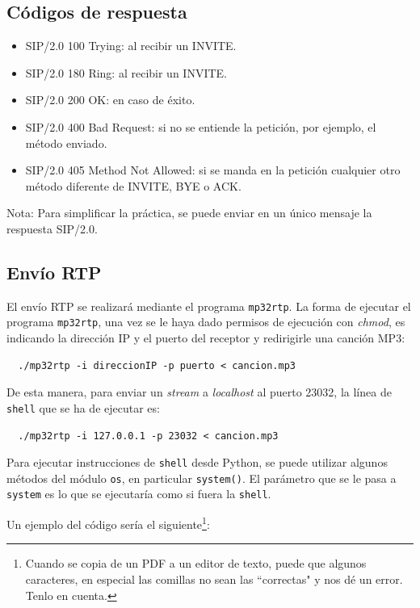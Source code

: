 \documentclass[a4paper,11pt]{article}
\begin{document}
\subsection*{Códigos de respuesta}

   \begin{itemize}
     \item SIP/2.0 100 Trying: al recibir un INVITE.
     \item SIP/2.0 180 Ring: al recibir un INVITE.
     \item SIP/2.0 200 OK: en caso de éxito.
     \item SIP/2.0 400 Bad Request: si no se entiende la petición, por ejemplo, el método enviado.
     \item SIP/2.0 405 Method Not Allowed: si se manda en la petición cualquier otro método diferente de INVITE, BYE o ACK.
   \end{itemize}

Nota: Para simplificar la práctica, se puede enviar en un único mensaje la respuesta SIP/2.0.

\subsection*{Envío RTP}

El envío RTP se realizará mediante el programa \texttt{mp32rtp}. La forma de ejecutar el programa \texttt{mp32rtp}, una vez se le haya dado permisos de ejecución con \emph{chmod}, es indicando la dirección IP y el puerto del receptor y redirigirle una canción MP3:

\begin{verbatim}
  ./mp32rtp -i direccionIP -p puerto < cancion.mp3
\end{verbatim}

De esta manera, para enviar un \emph{stream} a \emph{localhost} al puerto 23032, la línea de \texttt{shell} que se ha de ejecutar es:

\begin{verbatim}
  ./mp32rtp -i 127.0.0.1 -p 23032 < cancion.mp3
\end{verbatim}

Para ejecutar instrucciones de \texttt{shell} desde Python, se puede utilizar algunos métodos del módulo \texttt{os}, en particular \texttt{system()}. El parámetro que se le pasa a \texttt{system} 
es lo que se ejecutaría como si fuera la \texttt{shell}.

Un ejemplo del código sería el siguiente\footnote{Cuando se copia de un PDF
a un editor de texto, puede que algunos caracteres, en especial las comillas
no sean las ``correctas" y nos dé un error. Tenlo en cuenta.}:
\end{document}
